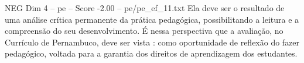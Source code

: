 \begin{textsample}{NEG Dim 4 – pe – Score -2.00 – pe/pe\_ef\_11.txt}
Ela deve ser o resultado de uma análise crítica permanente da prática pedagógica, possibilitando a leitura e a compreensão do seu desenvolvimento.
É nessa perspectiva que a avaliação, no Currículo de Pernambuco, deve ser vista : como oportunidade de reflexão do fazer pedagógico, voltada para a garantia dos direitos de aprendizagem dos estudantes.

\end{textsample}
